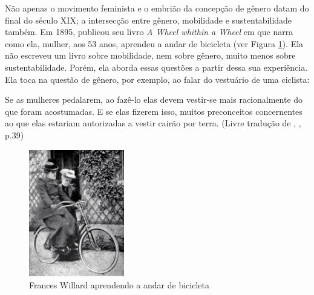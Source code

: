 Não apenas o movimento feminista e o embrião da concepção de gênero datam do final do século XIX; a intersecção entre gênero, mobilidade e sustentabilidade também. Em 1895,  publicou seu livro \emph{A Wheel whithin a Wheel} em que narra como ela, mulher, aos 53 anos, aprendeu a andar de bicicleta (ver Figura \ref{fig:willard}). Ela não escreveu um livro sobre mobilidade, nem sobre gênero, muito menos sobre sustentabilidade. Porém, ela aborda essas questões a partir dessa sua experiência. Ela toca na questão de gênero, por exemplo, ao falar do vestuário de uma ciclista:

\begin{citacao}
Se as mulheres pedalarem, ao fazê-lo elas devem vestir-se mais racionalmente do que foram acostumadas. E se elas fizerem isso, muitos preconceitos concernentes ao que elas estariam autorizadas a vestir cairão por terra. (Livre tradução de , \citeyear{WILLARD1895}, p.39)
\end{citacao}

\begin{figure}[htb]%
    \caption{\label{fig:willard}Frances Willard aprendendo a andar de bicicleta}%
    \begin{center}%
        \includegraphics[width=0.37\textwidth]{./imagens/Willard-p56.jpg}%
    \end{center}%
\end{figure}%


